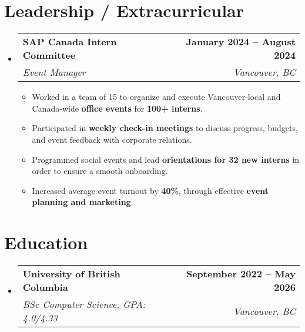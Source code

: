 \documentclass[letterpaper,11pt]{article}
\makeatletter
\newcommand{\bluey}[1]{{\color{customblue}#1}}
\newcommand{\resumeItem}[1]{
  \item\small{
    {#1 \vspace{-2pt}}
  }
}
\newcommand{\resumeSubheading}[4]{
  \vspace{-2pt}\item
    \begin{tabular*}{1.0\textwidth}[t]{l@{\extracolsep{\fill}}r}
      \textbf{#1} & \textbf{\small #2} \\
      \textit{\small#3} & \textit{\small #4} \\
    \end{tabular*}\vspace{-7pt}
}
\newcommand{\resumeSubHeadingListStart}{\begin{itemize}[leftmargin=0.0in, label={}]}
\newcommand{\resumeSubHeadingListEnd}{\end{itemize}}
\newcommand{\resumeItemListStart}{\begin{itemize}}
\newcommand{\resumeItemListEnd}{\end{itemize}\vspace{-5pt}}
\makeatother
\begin{document}
\section{Leadership / Extracurricular}
    \resumeSubHeadingListStart
        \resumeSubheading{\bluey{SAP Canada Intern Committee}}{January 2024 -- August 2024}{\bluey{Event Manager}}{Vancouver, BC}
            \resumeItemListStart
                \resumeItem{Worked in a team of 15 to organize and execute Vancouver-local and Canada-wide \textbf{office events} for \textbf{100+ interns}.}
                \resumeItem{Participated in \textbf{weekly check-in meetings} to discuss progress, budgets, and event feedback with corporate relations.}
                \resumeItem{Programmed social events and lead \textbf{orientations for 32 new interns} in order to ensure a smooth onboarding.}
                \resumeItem{Increased average event turnout by \textbf{40\%}, through effective \textbf{event planning and marketing}.}
            \resumeItemListEnd
        
    \resumeSubHeadingListEnd

\section{Education}
  \resumeSubHeadingListStart
    \resumeSubheading
      {University of British Columbia}{September 2022 -- May 2026}
      {BSc Computer Science, \rm{GPA: 4.0/4.33}}{Vancouver, BC}
  \resumeSubHeadingListEnd

%
\end{document}
